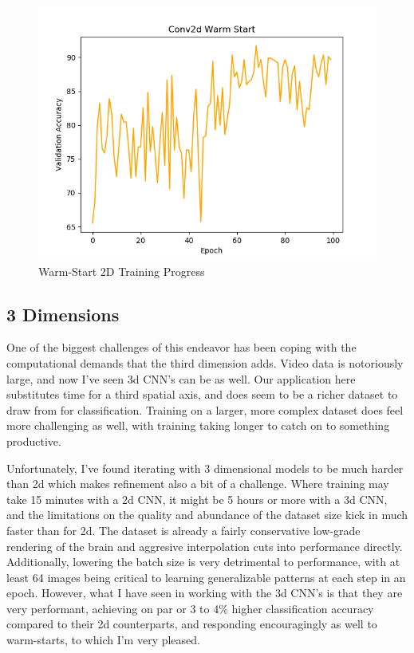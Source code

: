  \begin{figure}
  \includegraphics[width=\linewidth]{images/2d_warm.png}
  \caption{Warm-Start 2D Training Progress}
  \label{fig:2d_warm}
\end{figure}

\subsection{3 Dimensions}\label{subsec:3-dimensions}

One of the biggest challenges of this endeavor has been coping with the computational demands that the third
dimension adds.
Video data is notoriously large, and now I've seen 3d CNN's can be as well.
Our application here substitutes time for a third spatial axis, and does seem to be a richer dataset to draw from for
classification.
Training on a larger, more complex dataset does feel more challenging as well, with training taking longer to catch on
to something productive.

Unfortunately, I've found iterating with 3 dimensional models to be much harder than 2d which makes refinement also a
bit of a challenge.
Where training may take 15 minutes with a 2d CNN, it might be 5 hours or more with a 3d CNN, and the limitations on the
quality and abundance of the dataset size kick in much faster than for 2d.
The dataset is already a fairly conservative low-grade rendering of the brain and aggresive interpolation cuts into
performance directly.
Additionally, lowering the batch size is very detrimental to performance, with at least 64 images being critical to
learning generalizable patterns at each step in an epoch.
However, what I have seen in working with the 3d CNN's is that they are very performant, achieving on par or
3 to 4\% higher classification accuracy compared to their 2d counterparts, and responding encouragingly as well to warm-starts,
to which I'm very pleased.

